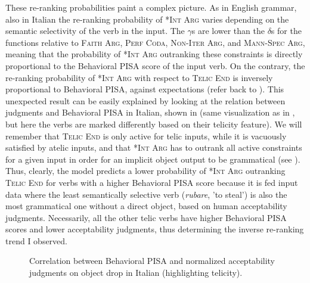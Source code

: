 These re-ranking probabilities paint a complex picture. As in English grammar, also in Italian the re-ranking probability of \textsc{*Int Arg} varies depending on the semantic selectivity of the verb in the input. The $\gamma$s are lower than the $\delta$s for the functions relative to \textsc{Faith Arg}, \textsc{Perf Coda}, \textsc{Non-Iter Arg}, and \textsc{Mann-Spec Arg}, meaning that the probability of \textsc{*Int Arg} outranking these constraints is directly proportional to the Behavioral PISA score of the input verb. On the contrary, the re-ranking probability of \textsc{*Int Arg} with respect to \textsc{Telic End} is inversely proportional to Behavioral PISA, against expectations (refer back to ). This unexpected result can be easily explained by looking at the relation between judgments and Behavioral PISA in Italian, shown in  (same visualization as in , but here the verbs are marked differently based on their telicity feature). We will remember that \textsc{Telic End} is only active for telic inputs, while it is vacuously satisfied by atelic inputs, and that \textsc{*Int Arg} has to outrank all active constraints for a given input in order for an implicit object output to be grammatical (see ). Thus, clearly, the model predicts a lower probability of \textsc{*Int Arg} outranking \textsc{Telic End} for verbs with a higher Behavioral PISA score because it is fed input data where the least semantically selective verb (\textit{rubare}, 'to steal') is also the most grammatical one without a direct object, based on human acceptability judgments. Necessarily, all the other telic verbs have higher Behavioral PISA scores and lower acceptability judgments, thus determining the inverse re-ranking trend I observed.

\begin{figure}[htb]
\caption{Correlation between Behavioral PISA and normalized acceptability judgments on object drop in Italian (highlighting telicity).}
    
\end{figure}

